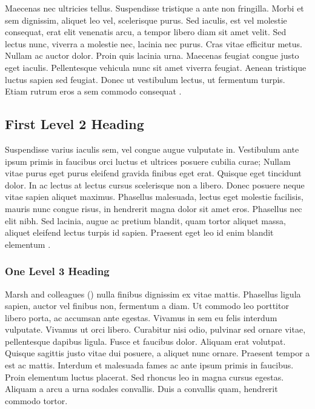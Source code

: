 \maketitle




Maecenas nec ultricies tellus. Suspendisse tristique a ante non fringilla. Morbi et sem dignissim, aliquet leo vel, scelerisque purus. Sed iaculis, est vel molestie consequat, erat elit venenatis arcu, a tempor libero diam sit amet velit. Sed lectus nunc, viverra a molestie nec, lacinia nec purus. Cras vitae efficitur metus. Nullam ac auctor dolor. Proin quis lacinia urna. Maecenas feugiat congue justo eget iaculis. Pellentesque vehicula nunc sit amet viverra feugiat. Aenean tristique luctus sapien sed feugiat. Donec ut vestibulum lectus, ut fermentum turpis. Etiam rutrum eros a sem commodo consequat \parencite{ludtke:2008}.

\subsection{First Level 2 Heading}

Suspendisse varius iaculis sem, vel congue augue vulputate in. Vestibulum ante ipsum primis in faucibus orci luctus et ultrices posuere cubilia curae; Nullam vitae purus eget purus eleifend gravida finibus eget erat. Quisque eget tincidunt dolor. In ac lectus at lectus cursus scelerisque non a libero. Donec posuere neque vitae sapien aliquet maximus. Phasellus malesuada, lectus eget molestie facilisis, mauris nunc congue risus, in hendrerit magna dolor sit amet eros. Phasellus nec elit nibh. Sed lacinia, augue ac pretium blandit, quam tortor aliquet massa, aliquet eleifend lectus turpis id sapien. Praesent eget leo id enim blandit elementum \parencite{marsh:2009}.

\subsubsection{One Level 3 Heading}

Marsh and colleagues (\citeyear{marsh:2009}) nulla finibus dignissim ex vitae mattis. Phasellus ligula sapien, auctor vel finibus non, fermentum a diam. Ut commodo leo porttitor libero porta, ac accumsan ante egestas. Vivamus in sem eu felis interdum vulputate. Vivamus ut orci libero. Curabitur nisi odio, pulvinar sed ornare vitae, pellentesque dapibus ligula. Fusce et faucibus dolor. Aliquam erat volutpat. Quisque sagittis justo vitae dui posuere, a aliquet nunc ornare. Praesent tempor a est ac mattis. Interdum et malesuada fames ac ante ipsum primis in faucibus. Proin elementum luctus placerat. Sed rhoncus leo in magna cursus egestas. Aliquam a arcu a urna sodales convallis. Duis a convallis quam, hendrerit commodo tortor.

